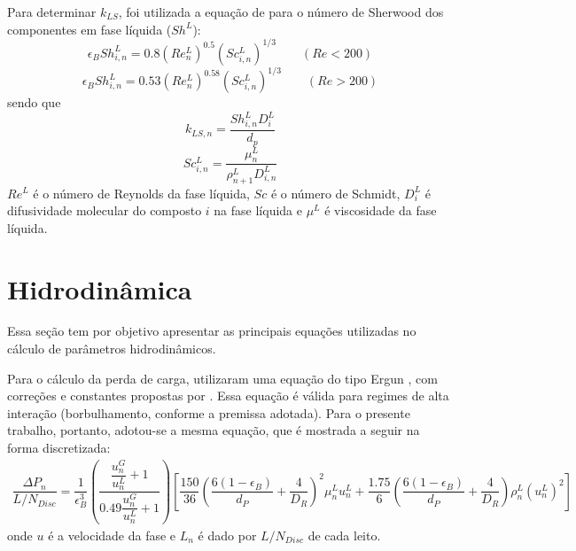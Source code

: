 Para determinar $k_{LS}$, foi utilizada a equação de 
para o número de Sherwood dos componentes em fase líquida ($Sh^L$):
\begin{equation}
\epsilon_BSh^L_{i,n} = \num{0,8}(Re^L_n)^{\num{0,5}}(Sc^L_{i,n})^{1/3} \qquad
(Re<200)
\label{eq:Sh1}
\end{equation}
\begin{equation}
\epsilon_BSh^L_{i,n} = \num{0,53}(Re^L_n)^{\num{0,58}}(Sc^L_{i,n})^{1/3} \qquad
(Re>200)
\label{eq:Sh2}
\end{equation}
sendo que
\begin{equation}
k_{LS,n} = \dfrac{Sh^L_{i,n}D^L_{i}}{d_p}
\label{eq:kLS}
\end{equation}
\begin{equation} 
Sc^L_{i,n} = \dfrac{\mu^L_{n}}{\rho^L_{n+1}D^L_{i,n}}
\label{eq:Sc}
\end{equation}
$Re^L$ é o número de Reynolds da fase líquida, $Sc$ é o número de Schmidt,
$D^L_{i}$ é difusividade molecular do composto $i$ na fase líquida e $\mu^L$ é
viscosidade da fase líquida.


\section{Hidrodinâmica} \label{sec:hidrodinamica3}

Essa seção tem por objetivo apresentar as principais equações utilizadas no
cálculo de parâmetros hidrodinâmicos.

Para o cálculo da perda de carga,  utilizaram uma equação
do tipo Ergun , com correções e constantes propostas
por . Essa equação é válida para regimes de alta
interação (borbulhamento, conforme a premissa adotada). Para o presente
trabalho, portanto, adotou-se a mesma equação, que é mostrada a seguir na forma
discretizada:
\begin{equation}
\label{eq:deltaP}
\begin{split}
\dfrac{\Delta P_{n}}{L/N_{Disc}} = \dfrac{1}{\epsilon_B^{3}}
\left(\dfrac{\dfrac{u^{G}_{n}}{u^{L}_{n}} +
1}{\num{0,49}\dfrac{u^{G}_{n}}{u^{L}_{n}} + 1}\right)
\left[\dfrac{150}{36}\left(\dfrac{6(1-\epsilon_B)} {d_P}+\dfrac{4}{D_R}
\right)^2\mu^{L}_{n}u^{L}_{n} + \dfrac{\num{1,75}}{6}
\left(\dfrac{6(1-\epsilon_B)} {d_P} + \dfrac{4}{D_R}\right)
\rho^{L}_{n}(u^{L}_{n})^2 \right]
\end{split}
\end{equation}
onde $u$ é a velocidade da fase e $L_n$ é dado por $L/N_{Disc}$ de cada leito.

